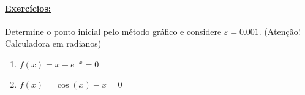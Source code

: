 \documentclass{article}
\begin{document}
            \paragraph{\underline{Exercícios:}} Determine o ponto inicial pelo método gráfico e considere $\varepsilon = 0.001$. (Atenção! Calculadora em radianos)
            \begin{enumerate}[label=\textbf{ (\alph*)}]
                \item $f(x) = x - e^{-x} = 0$
                \item $f(x) = \cos{(x)} - x = 0$
            \end{enumerate}
\end{document}
